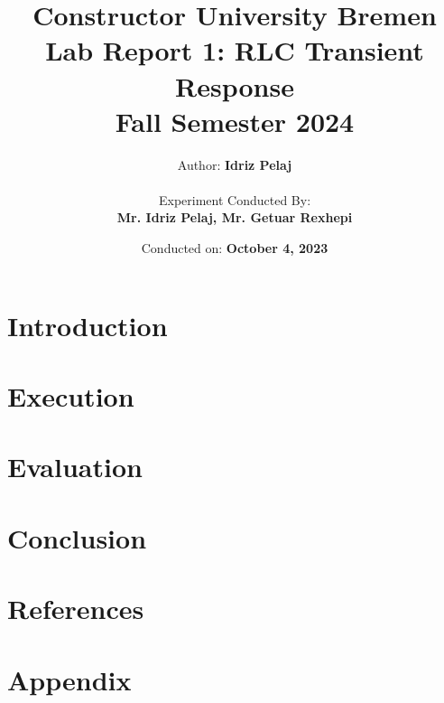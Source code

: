 \documentclass[12pt]{report}
\title{
    \textbf{Constructor University Bremen} \\
    \vspace{1cm}
    \textbf{Lab Report 1: RLC Transient Response} \\ 
    Fall Semester 2024 \\
}
\author{
    Author: \textbf{Idriz Pelaj} \\
    \vspace{1cm} \\
    Experiment Conducted By: \\ \textbf{Mr. Idriz Pelaj, Mr. Getuar Rexhepi}
}
\date{Conducted on: \textbf{October 4, 2023}}
\begin{document}
\maketitle

\chapter{Introduction}
\vspace{-1cm}


\chapter{Execution}
\vspace{-1cm}


\chapter{Evaluation}
\vspace{-1cm}


\chapter{Conclusion}
\vspace{-1cm}


\chapter{References}
\vspace{-1cm}


\chapter{Appendix}
\vspace{-1cm}

\end{document}
